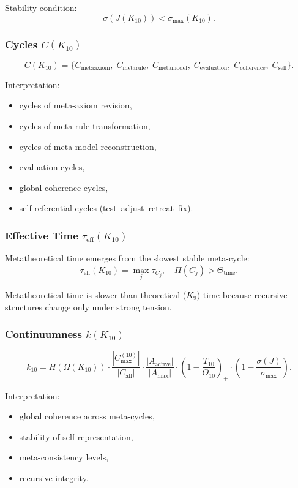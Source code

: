 Stability condition:
\[
\sigma(J(K_{10})) < \sigma_{\max}(K_{10}).
\]

\subsubsection{Cycles $C(K_{10})$}

\[
C(K_{10})=
\{
C_{\mathrm{metaaxiom}},\;
C_{\mathrm{metarule}},\;
C_{\mathrm{metamodel}},\;
C_{\mathrm{evaluation}},\;
C_{\mathrm{coherence}},\;
C_{\mathrm{self}}
\}.
\]

Interpretation:
\begin{itemize}
    \item cycles of meta-axiom revision,
    \item cycles of meta-rule transformation,
    \item cycles of meta-model reconstruction,
    \item evaluation cycles,
    \item global coherence cycles,
    \item self-referential cycles (test–adjust–retreat–fix).
\end{itemize}

\subsubsection{Effective Time $\tau_{\mathrm{eff}}(K_{10})$}

Metatheoretical time emerges from the slowest stable meta-cycle:
\[
\tau_{\mathrm{eff}}(K_{10}) = \max_j \tau_{C_j},
\quad
\Pi(C_j) > \Theta_{\mathrm{time}}.
\]

Metatheoretical time is slower than theoretical ($K_9$) time because recursive structures change only under strong tension.

\subsubsection{Continuumness $k(K_{10})$}

\[
k_{10} =
H(\Omega(K_{10}))
\cdot
\frac{|C_{\max}^{(10)}|}{|C_{\mathrm{all}}|}
\cdot
\frac{|A_{\mathrm{active}}|}{|A_{\max}|}
\cdot
\left(1-\frac{T_{10}}{\Theta_{10}}\right)_+
\cdot
\left(1-\frac{\sigma(J)}{\sigma_{\max}}\right).
\]

Interpretation:
\begin{itemize}
    \item global coherence across meta-cycles,
    \item stability of self-representation,
    \item meta-consistency levels,
    \item recursive integrity.
\end{itemize}

